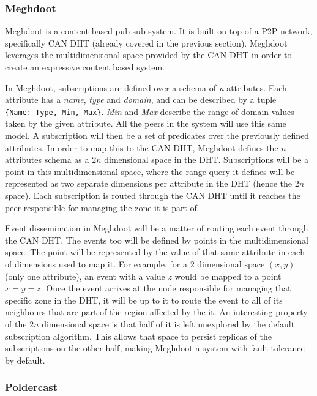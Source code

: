 \subsubsection{Meghdoot}\label{meghdoot}

Meghdoot \cite{Gupta2004} is a content based pub-sub system.
It is built on top of a P2P network, specifically CAN DHT (already
covered in the previous section). Meghdoot leverages the
multidimensional space provided by the CAN DHT in order to create an
expressive content based system.

In Meghdoot, subscriptions are defined over a schema of \emph{n}
attributes. Each attribute has a \emph{name}, \emph{type} and
\emph{domain}, and can be described by a tuple
\texttt{\{Name:\ Type,\ Min,\ Max\}}. \emph{Min} and \emph{Max} describe
the range of domain values taken by the given attribute. All the peers
in the system will use this same model. A subscription will then be a
set of predicates over the previously defined attributes. In order to
map this to the CAN DHT, Meghdoot defines the $n$ attributes schema
as a $2n$ dimensional space in the DHT. Subscriptions will be a
point in this multidimensional space, where the range query it defines
will be represented as two separate dimensions per attribute in the DHT
(hence the $2n$ space). Each subscription is routed through the CAN
DHT until it reaches the peer responsible for managing the zone it is
part of.

Event dissemination in Meghdoot will be a matter of routing each event
through the CAN DHT. The events too will be defined by points in the
multidimensional space. The point will be represented by the value of
that same attribute in each of dimensions used to map it. For example,
for a 2 dimensional space $(x,y)$ (only one attribute), an event
with a value $z$ would be mapped to a point $x=y=z$. Once the
event arrives at the node responsible for managing that specific zone in
the DHT, it will be up to it to route the event to all of its neighbours
that are part of the region affected by the it. An interesting property of
the $2n$ dimensional space is that half of it is left unexplored by
the default subscription algorithm. This allows that space to persist
replicas of the subscriptions on the other half, making Meghdoot a
system with fault tolerance by default.

\subsubsection{Poldercast}\label{poldercast}

